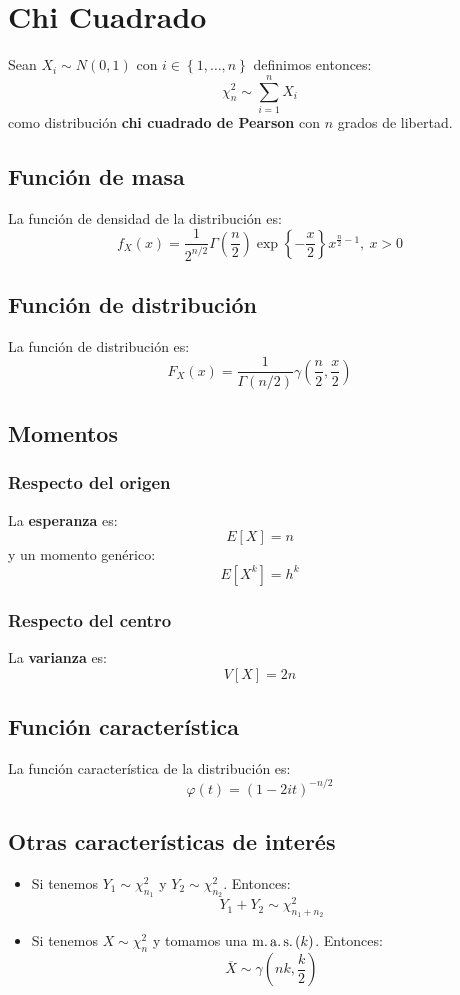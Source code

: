 \section{Chi Cuadrado}
\label{sec:chi_cuadrado}
Sean $X_i \sim N\left( 0, 1 \right)$ con $i \in \left\{ 1, \ldots, n \right\}$ definimos entonces:
\[
\chi^2_n \sim \sum_{i=1}^{n} X_i
\]
como distribución \textbf{chi cuadrado de Pearson} con $n$ grados de libertad.

\subsection{Función de masa}
La función de densidad de la distribución es:
\[
f_X \left( x \right) = \frac{1}{2^{n/2}}\Gamma\left( \frac{n}{2} \right)\exp\left\{ -\frac{x}{2} \right\} x^{\frac{n}{2} - 1},\ x > 0
\]

\subsection{Función de distribución}
La función de distribución es:
\[
F_X\left( x \right) = \frac{1}{\Gamma\left( n / 2 \right)}\gamma\left( \frac{n}{2}, \frac{x}{2} \right)
\]

\subsection{Momentos}

\subsubsection*{Respecto del origen}
La \textbf{esperanza} es: 
\[
    E\left[ X \right] = n
\]
y un momento genérico: 
\[
    E\left[ X^k \right] = h^k
\]
\subsubsection*{Respecto del centro}
La \textbf{varianza} es:
\[
    V\left[ X \right] = 2n
\]

\subsection{Función característica}
La función característica de la distribución es:
\[
\varphi\left( t \right) = \left( 1 - 2it \right)^{-n/2}
\]

\subsection{Otras características de interés}
\begin{itemize}
    \item Si tenemos $Y_1 \sim \chi^2_{n_1}$ y $Y_2 \sim \chi^2_{n_2}$. Entonces:
    \[
    Y_1 + Y_2 \sim \chi^2_{n_1 + n_2}
    \]
    \item Si tenemos $X \sim \chi^2_n$ y tomamos una $\operatorname{m.a.s.}\left( k \right)$. Entonces:
    \[
    \overline{X} \sim \gamma\left( nk, \frac{k}{2} \right)
    \]
\end{itemize}
